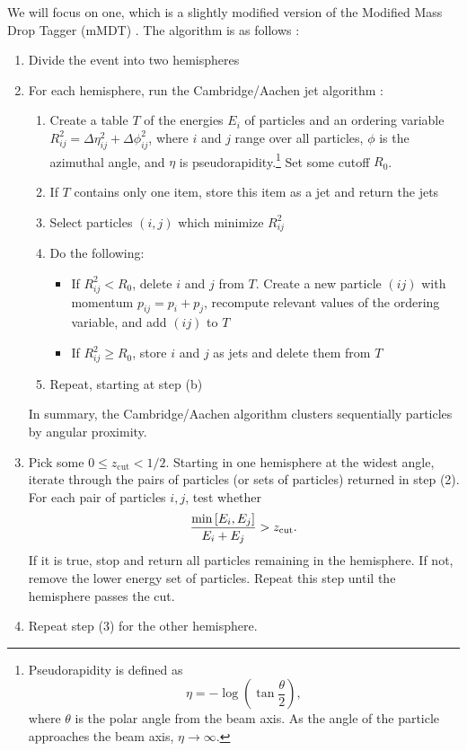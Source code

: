 \documentclass[../thesis.tex]{subfiles}
\providecommand{\zcut}{z_{\mathrm{cut}}}
\begin{document}
	We will focus on one, which is a slightly modified version of the Modified Mass Drop Tagger (mMDT) \cite{dasgupta_towards_2013}. The algorithm is as follows \cite{kardos_two-_2020}:
	\begin{enumerate}
		\item Divide the event into two hemispheres 

		\item For each hemisphere, run the Cambridge/Aachen jet algorithm \cite{dokshitzer_better_1997,wobisch_hadronization_1998}:
		\begin{enumerate}
			\item Create a table $T$ of the energies $E_i$ of particles and an ordering variable $R_{ij}^2 = \Delta \eta_{ij}^2 + \Delta \phi_{ij}^2$, where $i$ and $j$ range over all particles, $\phi$ is the azimuthal angle, and $\eta$ is pseudorapidity.\footnote{Pseudorapidity is defined as 
			\begin{equation} \eta = -\log(\tan\frac{\theta}{2}), \end{equation} where $\theta$ is the polar angle from the beam axis. As the angle of the particle approaches the beam axis, $\eta \to \infty$.} Set some cutoff $R_0$.

			\item If $T$ contains only one item, store this item as a jet and return the jets

			\item Select particles $(i, j)$ which minimize $R^2_{ij}$

			\item Do the following:
			\begin{itemize}
				\item If $R^2_{ij} < R_0$, delete $i$ and $j$ from $T$. Create a new particle $(ij)$ with momentum $p_{ij} = p_i + p_j$, recompute relevant values of the ordering variable, and add $(ij)$ to $T$

				\item If $R^2_{ij} \ge R_0$, store $i$ and $j$ as jets and delete them from $T$
			\end{itemize}

			\item Repeat, starting at step (b)
		\end{enumerate}
		In summary, the Cambridge/Aachen algorithm clusters sequentially particles by angular proximity.

		\item Pick some $0 \le \zcut < 1/2$. Starting in one hemisphere at the widest angle, iterate through the pairs of particles (or sets of particles) returned in step (2). For each pair of particles $i, j$, test whether
		\begin{equation}
			\frac{\min\qty[E_i, E_j]}{E_i + E_j} > \zcut.
		\end{equation}
		If it is true, stop and return all particles remaining in the hemisphere. If not, remove the lower energy set of particles. Repeat this step until the hemisphere passes the cut.

		\item Repeat step (3) for the other hemisphere.
	\end{enumerate}
\end{document}
